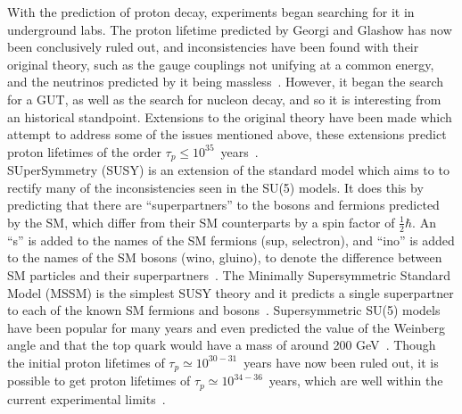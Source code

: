 With the prediction of proton decay, experiments began searching for it in underground labs. The proton lifetime predicted by Georgi and Glashow has now been conclusively ruled out, and inconsistencies have been found with their original theory, such as the gauge couplings not unifying at a common energy, and the neutrinos predicted by it being massless~\citep{Senjanovic:2009kr}. However, it began the search for a GUT, as well as the search for nucleon decay, and so it is interesting from an historical standpoint. Extensions to the original theory have been made which attempt to address some of the issues mentioned above, these extensions predict proton lifetimes of the order $\tau_{p} \leq 10^{35}$~years~\citep{Foot1989, Dorsner:2005fq}. \\

SUperSymmetry (SUSY) is an extension of the standard model which aims to to rectify many of the inconsistencies seen in the SU(5) models. It does this by predicting that there are ``superpartners'' to the bosons and fermions predicted by the SM, which differ from their SM counterparts by a spin factor of $\frac{1}{2}\hbar$. An ``s'' is added to the names of the SM fermions (sup, selectron), and ``ino'' is added to the names of the SM bosons (wino, gluino), to denote the difference between SM particles and their superpartners~\citep{Martin:1997ns}. The Minimally Supersymmetric Standard Model (MSSM) is the simplest SUSY theory and it predicts a single superpartner to each of the known SM fermions and bosons~\citep{Castano:1993ri}. Supersymmetric SU(5) models have been popular for many years and even predicted the value of the Weinberg angle and that the top quark would have a mass of around 200 GeV~\citep{Senjanovic:2009kr}. Though the initial proton lifetimes of $\tau_{p} \simeq 10^{30-31}$~years have now been ruled out, it is possible to get proton lifetimes of $\tau_{p} \simeq 10^{34-36}$~years, which are well within the current experimental limits~\citep{Gomez:1999kv}. \\

